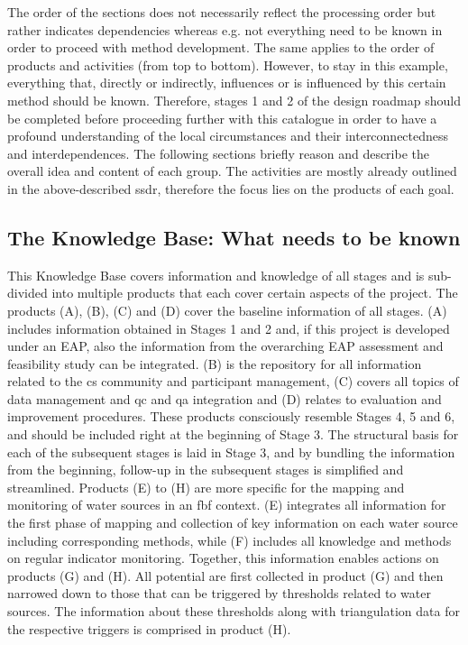 The order of the sections does not necessarily reflect the processing order but rather indicates dependencies whereas e.g. not everything need to be known in order to proceed with method development. The same applies to the order of products and activities (from top to bottom). However, to stay in this example, everything that, directly or indirectly, influences or is influenced by this certain method should be known. Therefore, stages 1 and 2 of the design roadmap should be completed before proceeding further with this catalogue in order to have a profound understanding of the local circumstances and their interconnectedness and interdependences.\newline
The following sections briefly reason and describe the overall idea and content of each group. The activities are mostly already outlined in the above-described \acrshort{ssdr}, therefore the focus lies on the products of each goal. 

\subsection{The Knowledge Base: What needs to be known}\label{subsubsec:knowledge}

This Knowledge Base covers information and knowledge of all stages and is sub-divided into multiple products that each cover certain aspects of the project. The products (A), (B), (C) and (D) cover the baseline information of all stages. (A) includes information obtained in Stages 1 and 2 and, if this project is developed under an EAP, also the information from the overarching EAP assessment and feasibility study can be integrated. (B) is the repository for all information related to the \acrlong{cs} community and participant management, (C) covers all topics of data management and \acrshort{qc} and \acrshort{qa} integration and (D) relates to evaluation and improvement procedures. These products consciously resemble Stages 4, 5 and 6, and should be included right at the beginning of Stage 3. The structural basis for each of the subsequent stages is laid in Stage 3, and by bundling the information from the beginning, follow-up in the subsequent stages is simplified and streamlined.\newline
Products (E) to (H) are more specific for the mapping and monitoring of water sources in an \acrshort{fbf} context. (E) integrates all information for the first phase of mapping and collection of key information on each water source including corresponding methods, while (F) includes all knowledge and methods on regular indicator monitoring. Together, this information enables actions on products (G) and (H). All potential  are first collected in product (G) and then narrowed down to those that can be triggered by thresholds related to water sources. The information about these thresholds along with triangulation data for the respective triggers is comprised in product (H).

